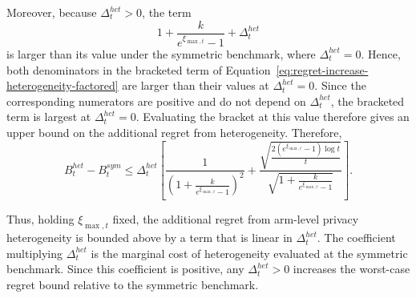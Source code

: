 \documentclass[mksc,nonblindrev]{informs3}
\begin{document}
\begin{APPENDICES}
Moreover, because $\Delta_t^{het}>0$, the term
\[
1+\frac{k}{e^{\xi_{\max,t}}-1}+\Delta_t^{het}
\]
is larger than its value under the symmetric benchmark, where
$\Delta_t^{het}=0$. Hence, both denominators in the bracketed term of
Equation~\eqref{eq:regret-increase-heterogeneity-factored} are larger than
their values at $\Delta_t^{het}=0$. Since the corresponding numerators are
positive and do not depend on $\Delta_t^{het}$, the bracketed term is largest
at $\Delta_t^{het}=0$. Evaluating the bracket at this value therefore gives
an upper bound on the additional regret from heterogeneity. Therefore,
\begin{equation}
\label{eq:regret-increase-heterogeneity-upper-bound}
B_t^{het}-B_t^{sym}
\leq
\Delta_t^{het}
\left[
\frac{1}
{
\left(
1+\frac{k}{e^{\xi_{\max,t}}-1}
\right)^2
}
+
\frac{
\sqrt{
\frac{
2(e^{\xi_{\max,t}}-1)\log t
}{
t
}
}
}
{
\sqrt{
1+\frac{k}{e^{\xi_{\max,t}}-1}
}
}
\right].
\end{equation}

Thus, holding $\xi_{\max,t}$ fixed, the additional regret from arm-level privacy heterogeneity is bounded above by a term that is linear in $\Delta_t^{het}$. The coefficient multiplying $\Delta_t^{het}$ is the marginal cost of heterogeneity evaluated at the symmetric benchmark. Since this coefficient is positive, any $\Delta_t^{het}>0$ increases the worst-case regret bound relative to the symmetric benchmark.
\appendix
\end{APPENDICES}



\end{document}
